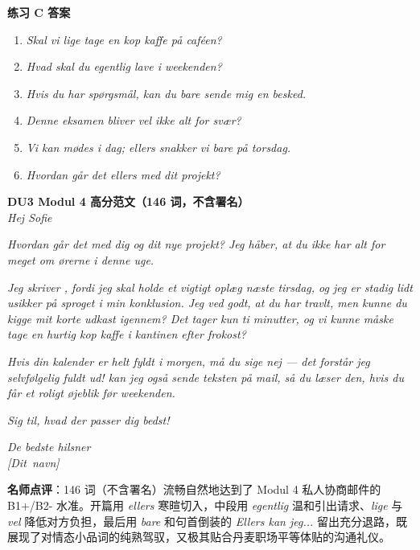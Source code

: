 \begin{answerbox}
\textbf{练习 C 答案}
\begin{enumerate}
  \item \textit{Skal vi lige tage en kop kaffe på caféen?}
  \item \textit{Hvad skal du egentlig lave i weekenden?}
  \item \textit{Hvis du har spørgsmål, kan du bare sende mig en besked.}
  \item \textit{Denne eksamen bliver vel ikke alt for svær?}
  \item \textit{Vi kan mødes i dag; ellers snakker vi bare på torsdag.}
  \item \textit{Hvordan går det ellers med dit projekt?}
\end{enumerate}

\textbf{DU3 Modul 4 高分范文（146 词，不含署名）}\\
\textit{Hej Sofie}

\textit{Hvordan går det  med dig og dit nye projekt? Jeg håber, at du ikke har alt for meget om ørerne i denne uge.}

\textit{Jeg skriver , fordi jeg skal holde et vigtigt oplæg næste tirsdag, og jeg er stadig lidt usikker på sproget i min konklusion. Jeg ved godt, at du har travlt, men kunne du  kigge mit korte udkast igennem? Det tager  kun ti minutter, og vi kunne måske tage en hurtig kop kaffe i kantinen efter frokost?}

\textit{Hvis din kalender er helt fyldt i morgen, må du  sige nej --- det forstår jeg selvfølgelig fuldt ud!  kan jeg også sende teksten på mail, så du  læser den, hvis du får et roligt øjeblik før weekenden.}

\textit{Sig  til, hvad der passer dig bedst!}

\textit{De bedste hilsner\\
\mbox{[Dit navn]}}

\small\textbf{名师点评}：146 词（不含署名）流畅自然地达到了 Modul 4 私人协商邮件的 B1+/B2- 水准。开篇用 \textit{ellers} 寒暄切入，中段用 \textit{egentlig} 温和引出请求、\textit{lige} 与 \textit{vel} 降低对方负担，最后用 \textit{bare} 和句首倒装的 \textit{Ellers kan jeg...} 留出充分退路，既展现了对情态小品词的纯熟驾驭，又极其贴合丹麦职场平等体贴的沟通礼仪。
\end{answerbox}